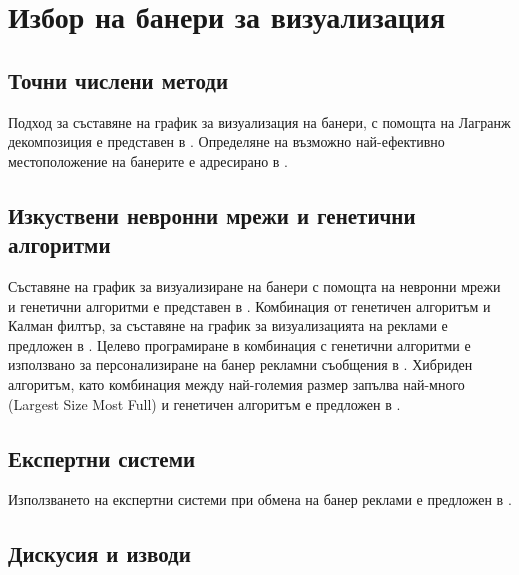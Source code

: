 \chapter{Избор на банери за визуализация}

\section{Точни числени методи}

Подход за съставяне на график за визуализация на банери, с помощта на Лагранж декомпозиция е представен в \cite{10.1145/945846.945848}. Определяне на възможно най-ефективно местоположение на банерите е адресирано в \cite{Kaul2018}.

\section{Изкуствени невронни мрежи и генетични алгоритми}

Съставяне на график за визуализиране на банери с помощта на невронни мрежи и генетични алгоритми е представен в \cite{DEANE20125168}. Комбинация от генетичен алгоритъм и Калман филтър, за съставяне на график за визуализацията на реклами е предложен в \cite{doi:10.1287/mksc.17.3.214}. Целево програмиране в комбинация с генетични алгоритми е използвано за персонализиране на банер рекламни съобщения в \cite{KARUGA200185}. Хибриден алгоритъм, като комбинация между най-големия размер запълва най-много (Largest Size Most Full) и генетичен алгоритъм е предложен в \cite{KUMAR20061067}.

\section{Експертни системи}

Използването на експертни системи при обмена на банер реклами е предложен в \cite{Krasteleva_Soshnikov_2002}.

\section{Дискусия и изводи}

